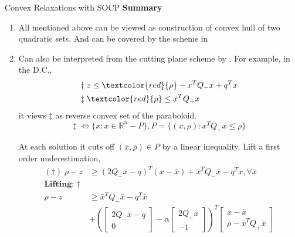 \documentclass[aspectratio=1612, 10pt]{beamer}
\newcommand{\red}[1]{\textcolor{red}{#1}}
\begin{document}
\begin{frame}[allowframebreaks]{Convex Relaxations with SOCP}
  \framebreak
  \textbf{Summary}
  \begin{enumerate}
    \item All mentioned above can be viewed as construction of convex hull of two quadratic sets. And can be covered by the scheme in \cite{burer_how_2017}
    \item Can also be interpreted from the cutting plane scheme by \cite{bienstock_cutting-planes_2014}. For example, in the D.C.,
          \begin{align*}
            \dagger\;  & z \le \textcolor{red}{\rho} - x^TQ_-x + q^Tx \\
            \ddagger\; & \red{\rho} \le x^TQ_+x                       \\
          \end{align*}
          it views \(\ddagger\) as reverse convex set of the paraboloid.
          \begin{equation}
            \ddagger\; \Leftrightarrow \{x: x\in \mathbb R^n - P\}, P = \{(x, \rho) : x^TQ_+x \le \rho\}
          \end{equation}

          \framebreak

          At each solution it cuts off \((\bar x, \bar \rho) \in P\) by a linear inequality.
          Lift a first order underestimation,
          \begin{align*}
            (\dagger)\; \rho - z & \ge \left(2Q_-\bar x - q\right)^T(x-\bar x) + \bar x^TQ_-\bar x - q^Tx, \forall \bar x \\
            \textbf{Lifting: } \dagger                                                                                    \\
            \rho - z             & \ge \bar{x}^{T} Q_- \bar{x} - q^{T} \bar{x}
            \\
                                 & +\left(
            \begin{bmatrix} 2Q_-\bar x - q \\ 0 \end{bmatrix} - \alpha
            \begin{bmatrix} 2Q_+ \bar{x} \\ -1 \end{bmatrix}
            \right)^{T}\begin{bmatrix}
              x-\bar{x} \\
              \bar\rho-\bar{x}^{T} Q_+ \bar{x}
            \end{bmatrix}                                                                         \\
          \end{align*}


\end{enumerate}
\end{frame}
\end{document}
